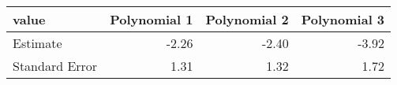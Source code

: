 \begin{tabular}{lrrr}
  \hline
value & Polynomial 1 & Polynomial 2 & Polynomial 3 \\ 
  \hline
Estimate & -2.26 & -2.40 & -3.92 \\ 
  Standard Error & 1.31 & 1.32 & 1.72 \\ 
   \hline
\end{tabular}
